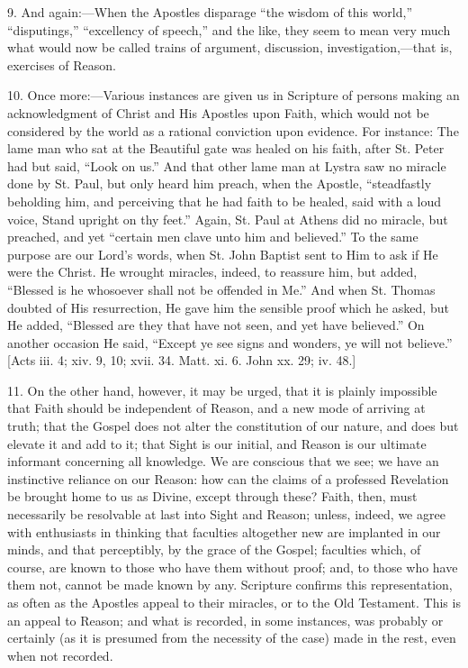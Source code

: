 9. And again:—When the Apostles disparage ``the wisdom of
this world,'' ``disputings,'' ``excellency of
speech,'' and the like, they seem to mean very much what would now
be called trains of argument, discussion, investigation,—that is,
exercises of Reason.

10. Once more:—Various instances are given us in Scripture of
persons making an acknowledgment of Christ and His Apostles upon
Faith, which would not be considered by the world as a rational
conviction upon evidence. For instance: The lame man who sat at the
Beautiful gate was healed on his faith, after St. Peter had but said,
``Look on us.'' And that other lame man at Lystra saw no
miracle done by St. Paul, but only heard him preach, when the Apostle,
``steadfastly beholding him, and perceiving that he had faith to
be healed, said with a loud voice, Stand upright on thy feet.''
Again, St. Paul at Athens did no miracle, but preached, and yet
``certain men clave unto him and believed.'' To the same
purpose are our Lord's words, when St. John Baptist sent to Him to ask
if He were the Christ. He wrought miracles, indeed, to reassure him,
but added, ``Blessed is he whosoever shall not be offended in
Me.'' And when St. Thomas doubted of His resurrection, He gave him
the sensible proof which he asked, but He added, ``Blessed are
they that have not seen, and yet have believed.'' On another
occasion He said, ``Except ye see signs and wonders, ye will not
believe.'' [Acts iii. 4; xiv. 9, 10; xvii. 34. Matt. xi. 6. John
xx. 29; iv. 48.]

11. On the other hand, however, it may be urged, that it is plainly
impossible that Faith should be independent of Reason, and a new mode
of arriving at truth; that the Gospel does not alter the constitution
of our nature, and does but elevate it and add to it; that Sight is
our initial, and Reason is our ultimate informant concerning all
knowledge. We are conscious that we see; we have an instinctive
reliance on our Reason: how can the claims of a professed Revelation
be brought home to us as Divine, except through these? Faith, then,
must necessarily be resolvable at last into Sight and Reason; unless,
indeed, we agree with enthusiasts in thinking that faculties
altogether new are implanted in our minds, and that perceptibly, by
the grace of the Gospel; faculties which, of course, are known to
those who have them without proof; and, to those who have them not,
cannot be made known by any. Scripture confirms this representation,
as often as the Apostles appeal to their miracles, or to the Old
Testament. This is an appeal to Reason; and what is recorded, in some
instances, was probably or certainly (as it is presumed from the
necessity of the case) made in the rest, even when not recorded.

